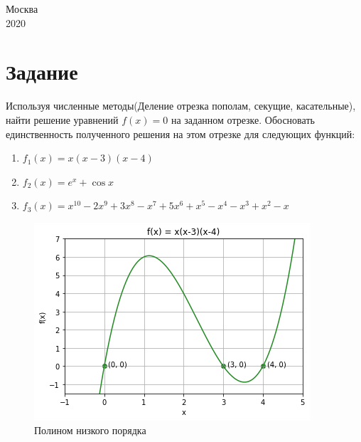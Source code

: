 \documentclass[a4paper,12pt]{extarticle}
\begin{document}
\begin{titlepage}
        \vspace{\fill}

        \begin{center}
            \large    Москва \\2020
        \end{center}

    \end{titlepage}

    \setcounter{page}{2}
    \tableofcontents
    \vspace{\baselineskip}

    \newpage


    \section{Задание}
    Используя численные методы(Деление отрезка пополам, секущие, касательные), найти решение уравнений $f(x) = 0$ на заданном отрезке. Обосновать единственность полученного решения на этом отрезке для следующих функций:

    \begin{enumerate}
        \item $f_1(x) = x(x-3)(x-4)$
        \item $f_2(x) = e^x + \cos x$
        \item $f_3(x) = x^{10} - 2x^9 + 3x^8 - x^7 + 5x^6 + x^5 - x^4 - x^3 + x^2 - x$
    \end{enumerate}

    \begin{figure}[h!]
        \centering
        \includegraphics[height=0.5\linewidth]{1.png}
        \caption{Полином низкого порядка}
        \label{fig:res1}
    \end{figure}
\end{document}
